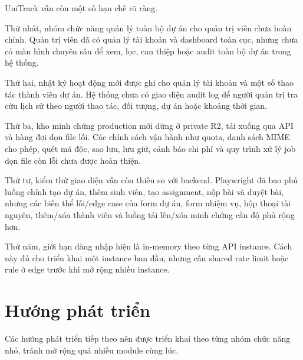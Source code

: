 UniTrack vẫn còn một số hạn chế rõ ràng.

Thứ nhất, nhóm chức năng quản lý toàn bộ dự án cho quản trị viên chưa hoàn chỉnh. Quản trị viên đã có quản lý tài khoản và dashboard toàn cục, nhưng chưa có màn hình chuyên sâu để xem, lọc, can thiệp hoặc audit toàn bộ dự án trong hệ thống.

Thứ hai, nhật ký hoạt động mới được ghi cho quản lý tài khoản và một số thao tác thành viên dự án. Hệ thống chưa có giao diện audit log để người quản trị tra cứu lịch sử theo người thao tác, đối tượng, dự án hoặc khoảng thời gian.

Thứ ba, kho minh chứng production mới dừng ở private R2, tải xuống qua API và hàng đợi dọn file lỗi. Các chính sách vận hành như quota, danh sách MIME cho phép, quét mã độc, sao lưu, lưu giữ, cảnh báo chi phí và quy trình xử lý job dọn file còn lỗi chưa được hoàn thiện.

Thứ tư, kiểm thử giao diện vẫn còn thiếu so với backend. Playwright đã bao phủ luồng chính tạo dự án, thêm sinh viên, tạo assignment, nộp bài và duyệt bài, nhưng các biến thể lỗi/edge case của form dự án, form nhiệm vụ, hộp thoại tài nguyên, thêm/xóa thành viên và luồng tải lên/xóa minh chứng cần độ phủ rộng hơn.

Thứ năm, giới hạn đăng nhập hiện là in-memory theo từng API instance. Cách này đủ cho triển khai một instance ban đầu, nhưng cần shared rate limit hoặc rule ở edge trước khi mở rộng nhiều instance.

\section{Hướng phát triển}

Các hướng phát triển tiếp theo nên được triển khai theo từng nhóm chức năng nhỏ, tránh mở rộng quá nhiều module cùng lúc.

